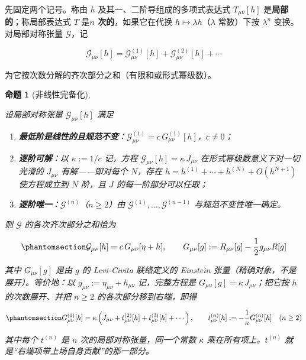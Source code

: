 \documentclass[
  chinese,
  a4paper,
  UTF8,
  12pt,
  oneside,
  openany]{ctexbook}
\theoremstyle{plain}
\theoremstyle{plain}
\theoremstyle{plain}
\newtheorem{proposition}{命题}[chapter]
\theoremstyle{definition}
\theoremstyle{plain}
\theoremstyle{plain}
\theoremstyle{remark}
\begin{document}
先固定两个记号。称由 \(h\) 及其一、二阶导组成的多项式表达式
\(T_{\mu\nu}[h]\) 是\textbf{局部的}；称局部表达式 \(T\) 是\textbf{\(n\)
次的}，如果它在代换 \(h\mapsto\lambda h\)（\(\lambda\) 常数）下按
\(\lambda^{n}\) 变换。对局部对称张量 \(\mathcal{G}\)，记

\[
\mathcal{G}_{\mu\nu}[h]=\mathcal{G}^{(1)}_{\mu\nu}[h]+\mathcal{G}^{(2)}_{\mu\nu}[h]+\cdots
\]

为它按次数分解的齐次部分之和（有限和或形式幂级数）。

\begin{proposition}[非线性完备化]\protect\hypertarget{prp-bootstrap}{}\label{prp-bootstrap}

设局部对称张量 \(\mathcal{G}_{\mu\nu}[h]\) 满足

\begin{enumerate}
\def\labelenumi{(\roman{enumi})}
\item
  \textbf{最低阶是线性的且规范不变}：\(\mathcal{G}^{(1)}_{\mu\nu}=c\,G^{(1)}_{\mu\nu}[h]\)，\(c\neq0\)；
\item
  \textbf{逐阶可解}：以 \(\kappa:=1/c\) 记，方程
  \(\mathcal{G}_{\mu\nu}[h]=\kappa\,J_{\mu\nu}\)
  在形式幂级数意义下对一切光滑的 \(J_{\mu\nu}\) 有解------即对每个
  \(N\)，存在 \(h=h^{(1)}+\cdots+h^{(N)}+O(h^{N+1})\) 使方程成立到 \(N\)
  阶，且 \(J\) 的每一阶部分可以任取；
\item
  \textbf{逐阶唯一}：\(\mathcal{G}^{(n)}\)（\(n\ge2\)）由
  \(\mathcal{G}^{(1)},\dots,\mathcal{G}^{(n-1)}\) 与规范不变性唯一确定。
\end{enumerate}

则 \(\mathcal{G}\) 的各次齐次部分之和恰为

\begin{equation}\protect\phantomsection\label{eq-einstein-fsg}{
\mathcal{G}_{\mu\nu}[h] = c\,G_{\mu\nu}[\eta+h],
\qquad
G_{\mu\nu}[g]:=R_{\mu\nu}[g]-\frac{1}{2}g_{\mu\nu}R[g]
}\end{equation}

其中 \(G_{\mu\nu}[g]\) 是由 \(g\) 的 Levi-Civita 联络定义的 Einstein
张量（精确对象，不是展开）。等价地：以
\(g_{\mu\nu}:=\eta_{\mu\nu}+h_{\mu\nu}\) 记，完整方程是
\(G_{\mu\nu}[g]=\kappa\,J_{\mu\nu}\)；把它按 \(h\) 的次数展开、并把
\(n\ge2\) 的各次部分移到右端，即得

\begin{equation}\protect\phantomsection\label{eq-bootstrap}{
G^{(1)}_{\mu\nu}[h]
= \kappa\left(J_{\mu\nu}+t^{(2)}_{\mu\nu}[h]+t^{(3)}_{\mu\nu}[h]+\cdots\right),
\qquad
t^{(n)}_{\mu\nu}[h]:=-\frac{1}{\kappa}G^{(n)}_{\mu\nu}[h]\quad(n\ge2)
}\end{equation}

其中每个 \(t^{(n)}\) 是 \(n\) 次的局部对称张量，同一个常数 \(\kappa\)
乘在所有项上。\(t^{(n)}\) 就是``右端项带上场自身贡献''的那一部分。

\end{proposition}
\end{document}
